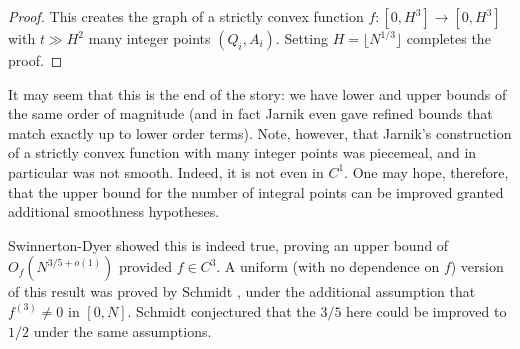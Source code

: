 \documentclass[12pt]{amsart}
\newcommand{\1}{{\mathbf 1}}
\theoremstyle{remark}
\theoremstyle{definition}
\begin{document}
\begin{proof}
This creates the graph of a strictly convex function $f:[0,H^3]\to [0,H^3]$ with $t\gg H^2$ many integer points $(Q_i,A_i)$. Setting $H=\lfloor N^{1/3}\rfloor$ completes the proof. 
\end{proof}

It may seem that this is the end of the story: we have lower and upper bounds of the same order of magnitude (and in fact Jarnik even gave refined bounds that match exactly up to lower order terms). Note, however, that Jarnik's construction of a strictly convex function with many integer points was piecemeal, and in particular was not smooth. Indeed, it is not even in $C^1$. One may hope, therefore, that the upper bound for the number of integral points can be improved granted additional smoothness hypotheses. 

Swinnerton-Dyer \cite{SD74} showed this is indeed true, proving an upper bound of $O_{f}(N^{3/5+o(1)})$ provided $f\in C^3$. A uniform (with no dependence on $f$) version of this result was proved by Schmidt \cite{Sc85}, under the additional assumption that $f^{(3)}\neq 0$ in $[0,N]$. Schmidt conjectured that the $3/5$ here could be improved to $1/2$ under the same assumptions.
\end{document}
